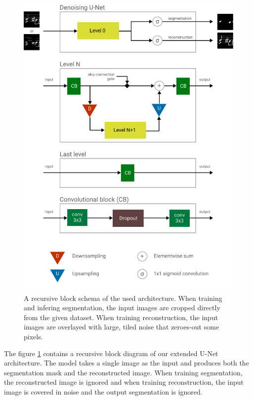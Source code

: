 \begin{figure}[p]
    \centering
    \includegraphics[width=145mm]{../img/architecture-pieces.pdf}
    \caption{A recursive block schema of the used architecture. When training and infering segmentation, the input images are cropped directly from the given dataset. When training reconstruction, the input images are overlayed with large, tiled noise that zeroes-out some pixels.}
    \label{fig:ArchitecturePieces}
\end{figure}

The figure \ref{fig:ArchitecturePieces} contains a recursive block diagram of our extended U-Net architecture. The model takes a single image as the input and produces both the segmentation mask and the reconstructed image. When training segmentation, the reconstructed image is ignored and when training reconstruction, the input image is covered in noise and the output segmentation is ignored.

